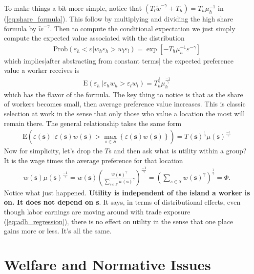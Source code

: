 \documentclass[pdftex,12pt]{article}
\begin{document}
\medskip
\noindent To make things a bit more simple, notice that $\left(T_l\tilde w ^{-\gamma} + T_h \right) = T_h \mu_h^{-1}$ in (\ref{eq:share_formula}). This follow by multiplying and dividing the high share formula by $\tilde w^{-\gamma}$. Then to compute the conditional expectation we just simply compute the expected value associated with the distribution
\begin{align}
\mathrm{Prob}\left( \varepsilon_h < \varepsilon | w_h \varepsilon_h >  w_l\varepsilon_l\right) = \exp\left[-T_h\mu_h^{-1}\varepsilon^{-\gamma}\right]
\end{align}
which implies|after abstracting from constant terms| the expected preference value a worker receives is
\begin{align}
\mathrm{E}\left(\varepsilon_h\ |\varepsilon_h w_h > \varepsilon_l w_l\right) = T_h^{\frac{1}{\gamma}} \mu_h^{\frac{-1}{\gamma}}
\end{align}
which has the flavor of the \citet{arkolakis2012new} formula. The key thing to notice is that as the share of workers becomes small, then average preference value increases. This is classic selection at work in the sense that only those who value a location the most will remain there. The general relationship takes the same form
\begin{align}
\mathrm{E}\left(\varepsilon(\textbf{s}) \ |\varepsilon(\textbf{s}) w(\textbf{s}) > \max_{s \in S}\left\{\varepsilon(\textbf{s}) w(\textbf{s})\right\}\right) = T(\textbf{s})^{\frac{1}{\gamma}} \mu(\textbf{s})^{\frac{-1}{\gamma}}
\end{align}
Now for simplicity, let's drop the $T$s and then ask what is utility within a group? It is the wage times the average preference for that location
\begin{align}
w(\textbf{s}) \mu(\textbf{s})^{\frac{-1}{\gamma}} =  w(\textbf{s}) \left(\frac{w(\textbf{s})^{\gamma}}{\sum_{s \in \mathcal{S}} w(\textbf{s})^{\gamma}}\right)^{\frac{-1}{\gamma}} 
 =  \left(\sum_{s \in \mathcal{S}} w(\textbf{s})^{\gamma}\right)^{\frac{1}{\gamma}} = \Phi. 
\end{align}
Notice what just happened. \textbf{Utility is independent of the island a worker is on. It does not depend on \textbf{s}}. It says, in terms of distributional effects, even though labor earnings are moving around with trade exposure (\ref{eq:adh_regression}), there is no effect on utility in the sense that one place gains more or less. It's all the same. 


\newpage

\section{Welfare and Normative Issues}





\newpage

\small

\end{document}
